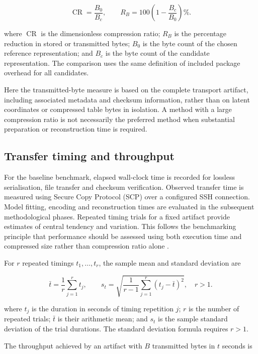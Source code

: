\[
\operatorname{CR}=\frac{B_0}{B_c},
\qquad
R_B=100\left(1-\frac{B_c}{B_0}\right)\%.\tag{3.5.1}
\]

\noindent where \(\operatorname{CR}\) is the dimensionless compression ratio;
\(R_B\) is the percentage reduction in stored or transmitted bytes;
\(B_0\) is the byte count of the chosen reference representation; and
\(B_c\) is the byte count of the candidate representation. The
comparison uses the same definition of included package overhead for all
candidates.

\noindent Here the transmitted-byte measure is based on the complete transport
artifact, including associated metadata and checksum information, rather
than on latent coordinates or compressed table bytes in isolation. A
method with a large compression ratio is not necessarily the preferred
method when substantial preparation or reconstruction time is required.

\subsection{Transfer timing and throughput}\label{transfer-timing-and-throughput}

For the baseline benchmark, elapsed wall-clock time is recorded for
lossless serialisation, file transfer and checksum verification.
Observed transfer time is measured using Secure Copy Protocol (SCP) over
a configured SSH connection. Model fitting, encoding and reconstruction
times are evaluated in the subsequent methodological phases. Repeated
timing trials for a fixed artifact provide estimates of central tendency
and variation. This follows the benchmarking principle that performance
should be assessed using both execution time and compressed size rather
than compression ratio alone \citep{Kryukov2020}.

\noindent For \(r\) repeated timings \(t_1,\ldots,t_r\), the sample mean and
standard deviation are

\[
\bar{t}=\frac{1}{r}\sum_{j=1}^{r}t_j,\qquad
s_t=\sqrt{\frac{1}{r-1}\sum_{j=1}^{r}(t_j-\bar{t})^2},
\quad r>1.\tag{3.5.2}
\]

\noindent where \(t_j\) is the duration in seconds of timing repetition \(j\);
\(r\) is the number of repeated trials; \(\bar{t}\) is their arithmetic
mean; and \(s_t\) is the sample standard deviation of the trial
durations. The standard deviation formula requires \(r>1\).

\noindent The throughput achieved by an artifact with \(B\) transmitted bytes in
\(t\) seconds is

